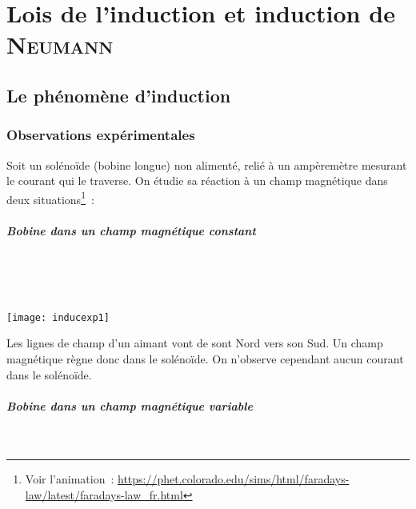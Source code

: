 \documentclass[../main/main.tex]{subfiles}
\begin{document}
\setcounter{chapter}{2}
\chapter{Lois de l'induction et induction de \textsc{Neumann}}
\label{ch:loisinduc}


\section{Le phénomène d'induction}
\label{sec:phinduc}
\subsection{Observations expérimentales}
\label{ssec:inducobsexp}

Soit un solénoïde (bobine longue) non alimenté, relié à un ampèremètre mesurant
le courant qui le traverse. On étudie sa réaction à un champ magnétique dans
deux situations\footnote{Voir l'animation~:
\url{https://phet.colorado.edu/sims/html/faradays-law/latest/faradays-law_fr.html}}~:

\paragraph*{Bobine dans un champ magnétique constant}~
\smallbreak

\noindent
\begin{minipage}[t]{.4\linewidth}
  ~
  \vspace*{-25pt}
  \begin{center}
    \texttt{[image: inducexp1]}
    \label{fig:inducexp1}
  \end{center}
\end{minipage}
\hfill
\begin{minipage}[t]{.55\linewidth}
  Les lignes de champ d'un aimant vont de sont Nord vers son Sud. Un champ
  magnétique règne donc dans le solénoïde. On n'observe cependant aucun courant
  dans le solénoïde.
\end{minipage}

\paragraph*{Bobine dans un champ magnétique variable}~
\smallbreak
\end{document}
